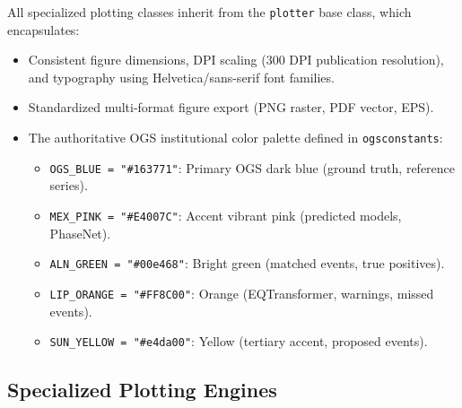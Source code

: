 All specialized plotting classes inherit from the \texttt{plotter} base class, which encapsulates:
\begin{itemize}
  \item Consistent figure dimensions, DPI scaling (300 DPI publication resolution), and typography using Helvetica/sans-serif font families.
  \item Standardized multi-format figure export (PNG raster, PDF vector, EPS).
  \item The authoritative OGS institutional color palette defined in \texttt{ogsconstants}:
  \begin{itemize}
    \item \texttt{OGS\_BLUE = "\#163771"}: Primary OGS dark blue (ground truth, reference series).
    \item \texttt{MEX\_PINK = "\#E4007C"}: Accent vibrant pink (predicted models, PhaseNet).
    \item \texttt{ALN\_GREEN = "\#00e468"}: Bright green (matched events, true positives).
    \item \texttt{LIP\_ORANGE = "\#FF8C00"}: Orange (EQTransformer, warnings, missed events).
    \item \texttt{SUN\_YELLOW = "\#e4da00"}: Yellow (tertiary accent, proposed events).
  \end{itemize}
\end{itemize}

\subsection{Specialized Plotting Engines}
\label{subsec:specialized_plotters}


